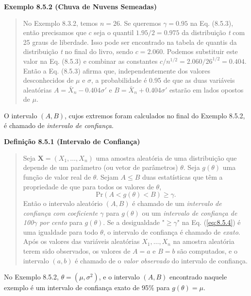 \vspace{1em}
\noindent\textbf{Exemplo 8.5.2 (Chuva de Nuvens Semeadas)}
\begin{quote}
    No Exemplo 8.3.2, temos $n=26$. Se queremos $\gamma = 0.95$ na Eq. (8.5.3), então precisamos que $c$ seja o quantil $1.95/2 = 0.975$ da distribuição \textit{t} com 25 graus de liberdade. Isso pode ser encontrado na tabela de quantis da distribuição \textit{t} no final do livro, sendo $c = 2.060$. Podemos substituir este valor na Eq. (8.5.3) e combinar as constantes $c/n^{1/2} = 2.060/26^{1/2} = 0.404$. Então a Eq. (8.5.3) afirma que, independentemente dos valores desconhecidos de $\mu$ e $\sigma$, a probabilidade é 0.95 de que as duas variáveis aleatórias $A = \bar{X}_n - 0.404\sigma'$ e $B = \bar{X}_n + 0.404\sigma'$ estarão em lados opostos de $\mu$.
\end{quote}
\vspace{1em}

O intervalo $(A, B)$, cujos extremos foram calculados no final do Exemplo 8.5.2, é chamado de \textit{intervalo de confiança}.

\vspace{1em}
\noindent\textbf{Definição 8.5.1 (Intervalo de Confiança)}
\begin{quote}
    Seja $\mathbf{X} = (X_1, \dots, X_n)$ uma amostra aleatória de uma distribuição que depende de um parâmetro (ou vetor de parâmetros) $\theta$. Seja $g(\theta)$ uma função de valor real de $\theta$. Sejam $A \le B$ duas estatísticas que têm a propriedade de que para todos os valores de $\theta$,
    \begin{equation} \label{eq:8.5.4}
        \text{Pr}(A < g(\theta) < B) \ge \gamma.
    \end{equation}
    Então o intervalo aleatório $(A, B)$ é chamado de um \textit{intervalo de confiança com coeficiente $\gamma$} para $g(\theta)$ ou um \textit{intervalo de confiança de 100$\gamma$ por cento} para $g(\theta)$. Se a desigualdade "$\ge \gamma$" na Eq. (\ref{eq:8.5.4}) é uma igualdade para todo $\theta$, o intervalo de confiança é chamado de \textit{exato}. Após os valores das variáveis aleatórias $X_1, \dots, X_n$ na amostra aleatória terem sido observados, os valores de $A=a$ e $B=b$ são computados, e o intervalo $(a, b)$ é chamado de o \textit{valor observado} do intervalo de confiança.
\end{quote}
\vspace{1em}

No Exemplo 8.5.2, $\theta = (\mu, \sigma^2)$, e o intervalo $(A, B)$ encontrado naquele exemplo é um intervalo de confiança exato de 95\% para $g(\theta) = \mu$.

